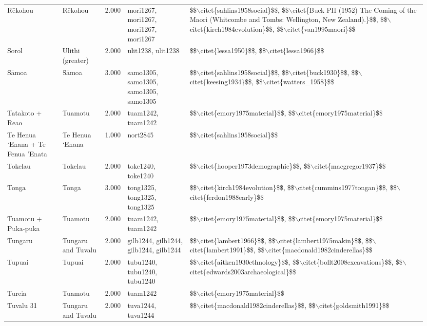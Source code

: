 \begin{longtable}{p{1.8cm}p{1.8cm}p{1.8cm}p{2cm}p{7cm}}
  Rēkohou & Rēkohou & 2.000 & mori1267, mori1267, mori1267, mori1267 & \$\$$\backslash$citet\{sahlins1958social\}\$\$, \$\$$\backslash$citet\{Buck PH (1952) The Coming of the Maori (Whitcombe and Tombs: Wellington, New Zealand).\}\$\$, \$\$$\backslash$citet\{kirch1984evolution\}\$\$, \$\$$\backslash$citet\{van1995maori\}\$\$ \\ 
  Sorol & Ulithi (greater) & 2.000 & ulit1238, ulit1238 & \$\$$\backslash$citet\{lessa1950\}\$\$, \$\$$\backslash$citet\{lessa1966\}\$\$ \\ 
  Sāmoa & Sāmoa & 3.000 & samo1305, samo1305, samo1305, samo1305 & \$\$$\backslash$citet\{sahlins1958social\}\$\$, \$\$$\backslash$citet\{buck1930\}\$\$, \$\$$\backslash$citet\{keesing1934\}\$\$, \$\$$\backslash$citet\{watters\_1958\}\$\$ \\ 
  Tatakoto + Reao & Tuamotu & 2.000 & tuam1242, tuam1242 & \$\$$\backslash$citet\{emory1975material\}\$\$, \$\$$\backslash$citet\{emory1975material\}\$\$ \\ 
  Te Henua ‘Enana + Te Fenua ’Enata & Te Henua ‘Enana & 1.000 & nort2845 & \$\$$\backslash$citet\{sahlins1958social\}\$\$ \\ 
  Tokelau & Tokelau & 2.000 & toke1240, toke1240 & \$\$$\backslash$citet\{hooper1973demographic\}\$\$, \$\$$\backslash$citet\{macgregor1937\}\$\$ \\ 
  Tonga & Tonga & 3.000 & tong1325, tong1325, tong1325 & \$\$$\backslash$citet\{kirch1984evolution\}\$\$, \$\$$\backslash$citet\{cummins1977tongan\}\$\$, \$\$$\backslash$citet\{ferdon1988early\}\$\$ \\ 
  Tuamotu + Puka-puka & Tuamotu & 2.000 & tuam1242, tuam1242 & \$\$$\backslash$citet\{emory1975material\}\$\$, \$\$$\backslash$citet\{emory1975material\}\$\$ \\ 
  Tungaru & Tungaru and Tuvalu & 2.000 & gilb1244, gilb1244, gilb1244, gilb1244 & \$\$$\backslash$citet\{lambert1966\}\$\$, \$\$$\backslash$citet\{lambert1975makin\}\$\$, \$\$$\backslash$citet\{lambert1991\}\$\$, \$\$$\backslash$citet\{macdonald1982cinderellas\}\$\$ \\ 
  Tupuai & Tupuai & 2.000 & tubu1240, tubu1240, tubu1240 & \$\$$\backslash$citet\{aitken1930ethnology\}\$\$, \$\$$\backslash$citet\{bollt2008excavations\}\$\$, \$\$$\backslash$citet\{edwards2003archaeological\}\$\$ \\ 
  Tureia & Tuamotu & 2.000 & tuam1242 & \$\$$\backslash$citet\{emory1975material\}\$\$ \\ 
  Tuvalu 31 & Tungaru and Tuvalu & 2.000 & tuva1244, tuva1244 & \$\$$\backslash$citet\{macdonald1982cinderellas\}\$\$, \$\$$\backslash$citet\{goldsmith1991\}\$\$ \\ 

\end{longtable}
